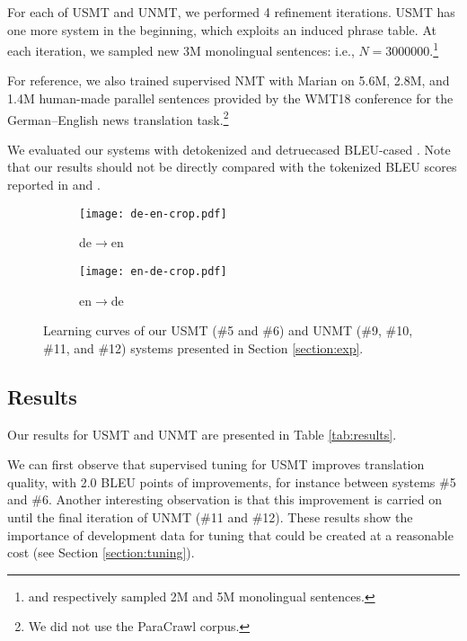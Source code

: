 \documentclass[11pt,a4paper]{article}
\newcommand{\marian}{Marian}
\begin{document}
For each of USMT and UNMT, we performed 4 refinement iterations. USMT has one more system in the beginning, which exploits an induced phrase table. At each iteration, we sampled new 3M monolingual sentences: i.e., $N=3000000$.\footnote{\citet{artetxe2018unsupervised} and \citet{DBLP:journals/corr/abs-1804-07755} respectively sampled 2M and 5M monolingual sentences.}

For reference, we also trained supervised NMT with {\marian} on 5.6M, 2.8M, and 1.4M human-made parallel sentences provided by the WMT18 conference for the German--English news translation task.\footnote{We did not use the ParaCrawl corpus.}

We evaluated our systems with detokenized and detruecased BLEU-cased \citep{papineni-EtAl:2002:ACL}. Note that our results should not be directly compared with the tokenized BLEU scores reported in \citet{artetxe2018unsupervised} and \citet{DBLP:journals/corr/abs-1804-07755}. 

\begin{figure*}[t]
    \centering
     \begin{subfigure}[b]{0.48\textwidth}
        \texttt{[image: de-en-crop.pdf]}
        \caption{de$\rightarrow$en}
        \label{fig:deenlc}
    \end{subfigure}
    \begin{subfigure}[b]{0.48\textwidth}
        \texttt{[image: en-de-crop.pdf]}
        \caption{en$\rightarrow$de}
        \label{fig:endelc}
    \end{subfigure}
    \caption{\label{fig:lc}Learning curves of our USMT (\#5 and \#6) and UNMT (\#9, \#10, \#11, and \#12) systems presented in Section \ref{section:exp}.}
\end{figure*}


\subsection{Results}

Our results for USMT and UNMT are presented in Table \ref{tab:results}. 

We can first observe that supervised tuning for USMT improves translation quality, with 2.0 BLEU points of improvements, for instance between systems \#5 and \#6. Another interesting observation is that this improvement is carried on until the final iteration of UNMT (\#11 and \#12). These results show the importance of development data for tuning that could be created at a reasonable cost (see Section \ref{section:tuning}).
\end{document}
